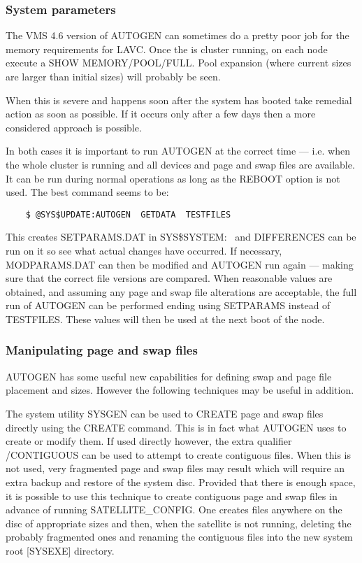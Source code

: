 \subsubsection {System parameters}

The VMS 4.6 version of AUTOGEN can sometimes do a pretty poor job for the memory
requirements for LAVC.
Once the is cluster running, on each node execute a SHOW MEMORY/POOL/FULL.
Pool expansion (where current sizes are larger than initial sizes) will
probably be seen.

When this is severe and happens soon after the system has booted take remedial
action as soon as possible.
If it occurs only after a few days then a more considered approach is possible.

In both cases it is important to run AUTOGEN at the correct time --- i.e.
when the whole cluster is running and all devices and page and swap files
are available.
It can be run during normal operations as long as the REBOOT option is not used.
The best command seems to be:
\begin{verbatim}
    $ @SYS$UPDATE:AUTOGEN  GETDATA  TESTFILES
\end{verbatim}
This creates SETPARAMS.DAT in SYS\$SYSTEM:~ and DIFFERENCES can be run on it
so see what actual changes have occurred.
If necessary, MODPARAMS.DAT can then be modified and  AUTOGEN run again ---
making sure that the correct file versions are compared.
When reasonable values are obtained, and assuming any page and swap file
alterations are acceptable, the full run of AUTOGEN can be performed ending
using SETPARAMS instead of TESTFILES.
These values will then be used at the next boot of the node.

\subsubsection {Manipulating page and swap files}
\label{manip_ps}

AUTOGEN has some useful new capabilities for defining swap and page file
placement and sizes.
However the following techniques may be useful in addition.

The system utility SYSGEN can be used to CREATE page and swap files directly
using the CREATE command.
This is in fact what AUTOGEN uses to create or modify them.
If used directly however, the extra qualifier /CONTIGUOUS can be used to
attempt to create contiguous files.
When this is not used, very fragmented page and swap files may result which
will require an extra backup and restore of the system disc.
Provided that there is enough space, it is possible to use this technique to
create contiguous page and swap files in advance of running SATELLITE\_CONFIG.
One creates files anywhere on the disc of appropriate sizes and then, when the
satellite is not running, deleting the probably fragmented ones and renaming
the contiguous files into the new system root [SYSEXE] directory.

